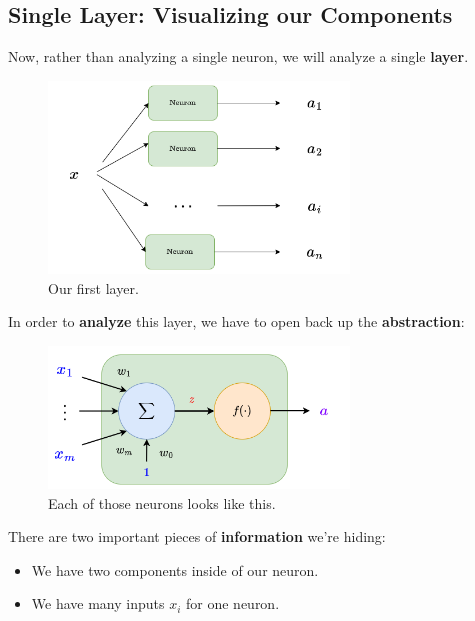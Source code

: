        
    \subsection{Single Layer: Visualizing our Components}
    
        Now, rather than analyzing a single neuron, we will analyze a single \textbf{layer}.
        
        \begin{figure}[H]
            \centering
            \includegraphics[width=80mm,scale=0.4]{images/nn_images/general_layer.png}
            \caption*{Our first layer.}
        \end{figure}
        
        In order to \textbf{analyze} this layer, we have to open back up the \textbf{abstraction}:
        
        \begin{figure}[H]
            \centering
            \includegraphics[width=80mm,scale=0.4]{images/nn_images/neuron_inside.png}
            \caption*{Each of those neurons looks like this.}
        \end{figure}
        
        There are two important pieces of \textbf{information} we're hiding:
        
        \begin{itemize}
            \item We have two components inside of our neuron.
            
            \item We have many inputs $x_i$ for one neuron.
        \end{itemize}
        

